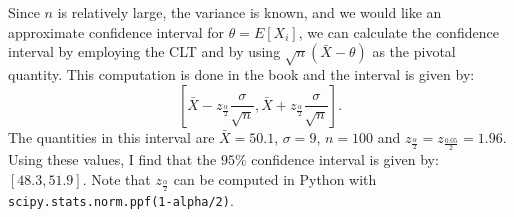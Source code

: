 \begin{problem}{11}  Since $n$ is relatively large, the variance is known, and we would like an approximate confidence interval for $\theta =E[X_i]$, we can calculate the confidence interval by employing the CLT and by using $\sqrt{n}(\bar X - \theta)$ as the pivotal quantity.  This computation is done in the book and the interval is given by:
\begin{equation*}
\left [\bar X -z_{\frac{\alpha}{2}}\frac{\sigma}{\sqrt{n}}, \bar X +z_{\frac{\alpha}{2}}\frac{\sigma}{\sqrt{n}} \right].
\end{equation*}
The quantities in this interval are $\bar X = 50.1$, $\sigma= 9$, $n=100$ and $z_\frac{\alpha}{2}=z_\frac{0.05}{2}=1.96$.  Using these values, I find that the $95\%$ confidence interval is given by: $[48.3, 51.9]$.  Note that $z_{\frac{\alpha}{2}}$ can be computed in Python with \texttt{scipy.stats.norm.ppf(1-alpha/2)}.





\end{problem}

